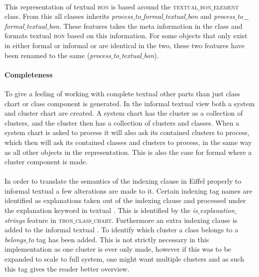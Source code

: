 \paragraph{}
This representation of textual \textsc{bon} is based around the \textsc{textual$\_$bon$\_$element} class. From this all classes inherits \textit{process$\_$to$\_$formal$\_$textual$\_$bon} and  \textit{process$\_$to$\_\newline$formal$\_$textual$\_$bon}. These features takes the meta information in the class and formats textual \textsc{bon} based on this information. For some objects that only exist in either formal or informal \bon{ } or are identical in the two, these two features have been renamed to the same (\textit{process$\_$to$\_$textual$\_$bon}).

\paragraph{Completeness}
To give a feeling of working with complete textual \bon{ } other parts than just class chart or class component is generated. In the informal textual \bon{ } view both a system and cluster chart are created. A system chart has the cluster as a collection of clusters, and the cluster then has a collection of clusters and classes. When a system chart is asked to process it will also ask its contained clusters to process, which then will ask its contained classes and clusters to process, in the same way as all other objects in the representation. This is also the case for formal \bon{ } where a cluster component is made.

\paragraph{}
In order to translate the semantics of the indexing clause in Eiffel properly to informal textual \bon{ } a few alterations are made to it. Certain indexing tag names are identified as explanations taken out of the indexing clause and processed under the explanation keyword in textual \bon. This is identified by the \textit{is$\_$explanation$\_$strings} feature in \textsc{tbon$\_$class$\_$chart}. Furthermore an extra indexing clause is added to the informal textual \bon{ }. To identify which cluster a class belongs to a \textit{belongs$\_$to} tag has been added. This is not strictly necessary in this implementation as one cluster is ever only made, however if this was to be expanded to scale to full system, one might want multiple clusters and as such this tag gives the reader better overview.

